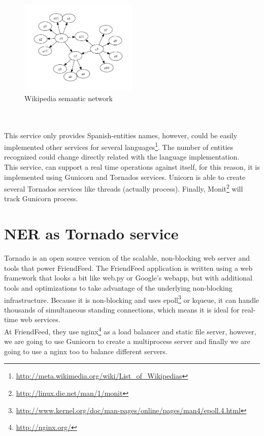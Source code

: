 \documentclass[a4paper,11pt]{article}
\begin{document}
\begin{figure}[htb]
\begin{center}
\includegraphics[width=0.5\textwidth]{img/wikipedia_structure.pdf}
\caption{Wikipedia semantic network}
\end{center}
\end{figure}
\\
\\
This service only provides Spanish-entities names, however, could be easily implemented other services for several languages\footnote{\url{http://meta.wikimedia.org/wiki/List\_of\_Wikipedias}}. The number of entities recognized could change directly related with the language implementation.
\\
This service, can support a real time operations against itself, for this reason, it is implemented using Gunicorn and Tornados services. Unicorn is able to create several Tornados services like threads (actually process). Finally, Monit\footnote{\url{http://linux.die.net/man/1/monit}} will track Gunicorn process.





\newpage
\section{NER as Tornado service}
Tornado is an open source version of the scalable, non-blocking web server and tools that power FriendFeed. The FriendFeed application is written using a web framework that looks a bit like web.py or Google's webapp, but with additional tools and optimizations to take advantage of the underlying non-blocking infrastructure. Because it is non-blocking and uses epoll\footnote{\url{http://www.kernel.org/doc/man-pages/online/pages/man4/epoll.4.html}} or kqueue, it can handle thousands of simultaneous standing connections, which means it is ideal for real-time web services.
\\
At FriendFeed, they use nginx\footnote{\url{http://nginx.org/}} as a load balancer and static file server, however, we are going to use Gunicorn to create a multiprocess server and finally we are going to use a nginx too to balance different servers.
\\
\end{document}
